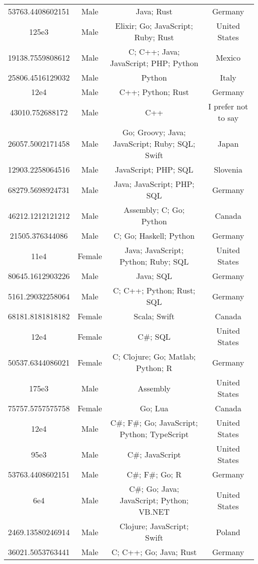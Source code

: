 \begin{center}
\begin{tabular}{ |c|c|c|c| }
53763.4408602151  &  Male  &  Java; Rust  &  Germany  \\ 
125e3  &  Male  &  Elixir; Go; JavaScript; Ruby; Rust  &  United States  \\ 
19138.7559808612  &  Male  &  C; C++; Java; JavaScript; PHP; Python  &  Mexico  \\ 
25806.4516129032  &  Male  &  Python  &  Italy  \\ 
12e4  &  Male  &  C++; Python; Rust  &  Germany  \\ 
43010.752688172  &  Male  &  C++  &  I prefer not to say  \\ 
26057.5002171458  &  Male  &  Go; Groovy; Java; JavaScript; Ruby; SQL; Swift  &  Japan  \\ 
12903.2258064516  &  Male  &  JavaScript; PHP; SQL  &  Slovenia  \\ 
68279.5698924731  &  Male  &  Java; JavaScript; PHP; SQL  &  Germany  \\ 
46212.1212121212  &  Male  &  Assembly; C; Go; Python  &  Canada  \\ 
21505.376344086  &  Male  &  C; Go; Haskell; Python  &  Germany  \\ 
11e4  &  Female  &  Java; JavaScript; Python; Ruby; SQL  &  United States  \\ 
80645.1612903226  &  Male  &  Java; SQL  &  Germany  \\ 
5161.29032258064  &  Male  &  C; C++; Python; Rust; SQL  &  Germany  \\ 
68181.8181818182  &  Female  &  Scala; Swift  &  Canada  \\ 
12e4  &  Female  &  C\#; SQL  &  United States  \\ 
50537.6344086021  &  Female  &  C; Clojure; Go; Matlab; Python; R  &  Germany  \\ 
175e3  &  Male  &  Assembly  &  United States  \\ 
75757.5757575758  &  Female  &  Go; Lua  &  Canada  \\ 
12e4  &  Male  &  C\#; F\#; Go; JavaScript; Python; TypeScript  &  United States  \\ 
95e3  &  Male  &  C\#; JavaScript  &  United States  \\ 
53763.4408602151  &  Male  &  C\#; F\#; Go; R  &  Germany  \\ 
6e4  &  Male  &  C\#; Go; Java; JavaScript; Python; VB.NET  &  United States  \\ 
2469.13580246914  &  Male  &  Clojure; JavaScript; Swift  &  Poland  \\ 
36021.5053763441  &  Male  &  C; C++; Go; Java; Rust  &  Germany  \\ 

\end{tabular}
\end{center}
